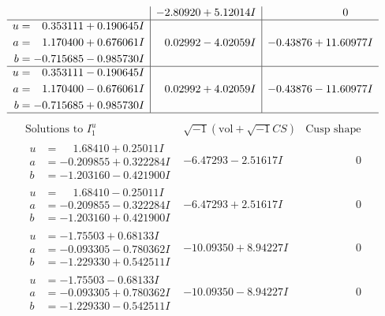 \documentclass[1p]{elsarticle_modified}
\theoremstyle{definition}
\newcommand{\I}{\sqrt{-1}}
\begin{document}
$$\begin{array}{c|c|c}
 & -2.80920 + 5.12014 I & \phantom{-0.000000 } 0 \\ \hline\begin{aligned}
u &= \phantom{-}0.353111 + 0.190645 I \\
a &= \phantom{-}1.170400 + 0.676061 I \\
b &= -0.715685 - 0.985730 I\end{aligned}
 & \phantom{-}0.02992 - 4.02059 I & -0.43876 + 11.60977 I \\ \hline\begin{aligned}
u &= \phantom{-}0.353111 - 0.190645 I \\
a &= \phantom{-}1.170400 - 0.676061 I \\
b &= -0.715685 + 0.985730 I\end{aligned}
 & \phantom{-}0.02992 + 4.02059 I & -0.43876 - 11.60977 I\\
 \hline 
 \end{array}$$\newpage$$\begin{array}{c|c|c}  
\text{Solutions to }I^u_{1}& \I (\text{vol} + \sqrt{-1}CS) & \text{Cusp shape}\\
 \hline 
\begin{aligned}
u &= \phantom{-}1.68410 + 0.25011 I \\
a &= -0.209855 + 0.322284 I \\
b &= -1.203160 - 0.421900 I\end{aligned}
 & -6.47293 - 2.51617 I & \phantom{-0.000000 } 0 \\ \hline\begin{aligned}
u &= \phantom{-}1.68410 - 0.25011 I \\
a &= -0.209855 - 0.322284 I \\
b &= -1.203160 + 0.421900 I\end{aligned}
 & -6.47293 + 2.51617 I & \phantom{-0.000000 } 0 \\ \hline\begin{aligned}
u &= -1.75503 + 0.68133 I \\
a &= -0.093305 - 0.780362 I \\
b &= -1.229330 + 0.542511 I\end{aligned}
 & -10.09350 + 8.94227 I & \phantom{-0.000000 } 0 \\ \hline\begin{aligned}
u &= -1.75503 - 0.68133 I \\
a &= -0.093305 + 0.780362 I \\
b &= -1.229330 - 0.542511 I\end{aligned}
 & -10.09350 - 8.94227 I & \phantom{-0.000000 } 0 \\ \hline\begin{aligned}

\end{aligned}
\end{array}$$
\end{document}
